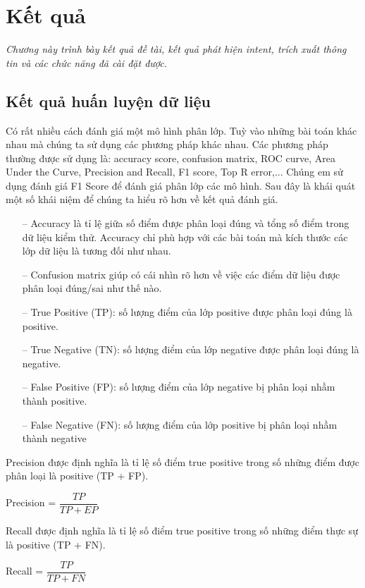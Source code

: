 \chapter{Kết quả}
\label{Chapter6}

\emph{Chương này trình bày kết quả đề tài, kết quả phát hiện intent, trích xuất thông tin và các chức năng đã cài đặt được.}

\section{Kết quả huấn luyện dữ liệu}

Có rất nhiều cách đánh giá một mô hình phân lớp. Tuỳ vào những bài toán khác nhau mà chúng ta sử dụng các phương pháp khác nhau. Các phương pháp thường được sử dụng là: accuracy score, confusion matrix, ROC curve, Area Under the Curve, Precision and Recall, F1 score, Top R error,... Chúng em sử dụng đánh giá F1 Score để đánh giá phân lớp các mô hình. Sau đây là khái quát một số khái niệm để chúng ta hiểu rõ hơn về kết quả đánh giá.

\begin{itemize}
    \item[--] Accuracy là tỉ lệ giữa số điểm được phân loại đúng và tổng số điểm trong dữ liệu kiểm thử. Accuracy chỉ phù hợp với các bài toán mà kích thước các lớp dữ liệu là tương đối như nhau.
    \item[--] Confusion matrix giúp có cái nhìn rõ hơn về việc các điểm dữ liệu được phân loại đúng/sai như thế nào.
    \item[--] True Positive (TP): số lượng điểm của lớp positive được phân loại đúng là positive.
    \item[--] True Negative (TN): số lượng điểm của lớp negative được phân loại đúng là negative.
    \item[--] False Positive (FP): số lượng điểm của lớp negative bị phân loại nhầm thành positive.
    \item[--] False Negative (FN): số lượng điểm của lớp positive bị phân loại nhầm thành negative
\end{itemize}

Precision được định nghĩa là tỉ lệ số điểm true positive trong số những điểm được phân loại là positive (TP + FP).
\begin{center}
    Precision = $\dfrac{TP}{TP+EP}$
\end{center}

Recall được định nghĩa là tỉ lệ số điểm true positive trong số những điểm thực sự là positive (TP + FN).
\begin{center}
    Recall = $\dfrac{TP}{TP+FN}$
\end{center}


